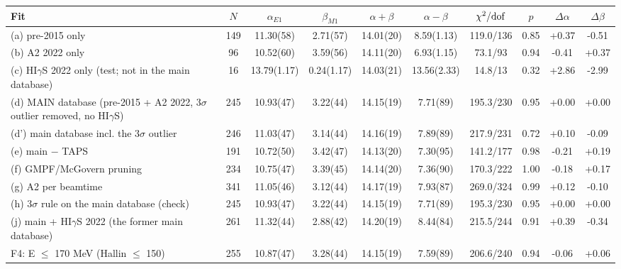 \begin{tabular}{lccccccccc}
\hline
Fit & $N$ & $\alpha_{E1}$ & $\beta_{M1}$ & $\alpha+\beta$ & $\alpha-\beta$ & $\chi^2/{\rm dof}$ & $p$ & $\Delta\alpha$ & $\Delta\beta$ \\
\hline
(a) pre-2015 only & 149 & 11.30(58) & 2.71(57) & 14.01(20) & 8.59(1.13) & 119.0/136 & 0.85 & +0.37 & -0.51 \\
(b) A2 2022 only & 96 & 10.52(60) & 3.59(56) & 14.11(20) & 6.93(1.15) & 73.1/93 & 0.94 & -0.41 & +0.37 \\
(c) HI$\gamma$S 2022 only (test; not in the main database) & 16 & 13.79(1.17) & 0.24(1.17) & 14.03(21) & 13.56(2.33) & 14.8/13 & 0.32 & +2.86 & -2.99 \\
(d) MAIN database (pre-2015 + A2 2022, 3$\sigma$ outlier removed, no HI$\gamma$S) & 245 & 10.93(47) & 3.22(44) & 14.15(19) & 7.71(89) & 195.3/230 & 0.95 & +0.00 & +0.00 \\
(d') main database incl. the 3$\sigma$ outlier & 246 & 11.03(47) & 3.14(44) & 14.16(19) & 7.89(89) & 217.9/231 & 0.72 & +0.10 & -0.09 \\
(e) main $-$ TAPS & 191 & 10.72(50) & 3.42(47) & 14.13(20) & 7.30(95) & 141.2/177 & 0.98 & -0.21 & +0.19 \\
(f) GMPF/McGovern pruning & 234 & 10.75(47) & 3.39(45) & 14.14(20) & 7.36(90) & 170.3/222 & 1.00 & -0.18 & +0.17 \\
(g) A2 per beamtime & 341 & 11.05(46) & 3.12(44) & 14.17(19) & 7.93(87) & 269.0/324 & 0.99 & +0.12 & -0.10 \\
(h) 3$\sigma$ rule on the main database (check) & 245 & 10.93(47) & 3.22(44) & 14.15(19) & 7.71(89) & 195.3/230 & 0.95 & +0.00 & +0.00 \\
(j) main + HI$\gamma$S 2022 (the former main database) & 261 & 11.32(44) & 2.88(42) & 14.20(19) & 8.44(84) & 215.5/244 & 0.91 & +0.39 & -0.34 \\
F4: E $\le$ 170 MeV (Hallin $\le$ 150) & 255 & 10.87(47) & 3.28(44) & 14.15(19) & 7.59(89) & 206.6/240 & 0.94 & -0.06 & +0.06 \\
\hline
\end{tabular}

